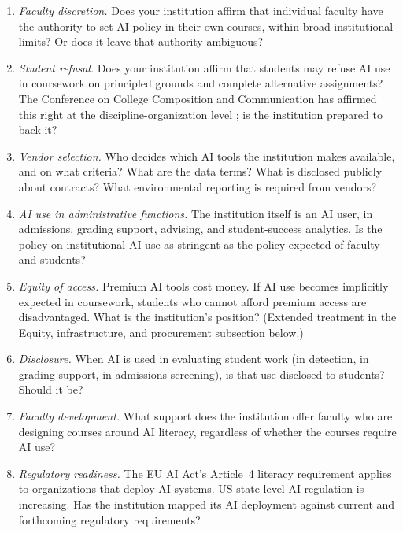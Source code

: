 \documentclass[12pt]{article}
\begin{document}
\begin{enumerate}
\item \emph{Faculty discretion.} Does your institution affirm that individual faculty have the authority to set AI policy in their own courses, within broad institutional limits? Or does it leave that authority ambiguous?

\item \emph{Student refusal.} Does your institution affirm that students may refuse AI use in coursework on principled grounds and complete alternative assignments? The Conference on College Composition and Communication has affirmed this right at the discipline-organization level \autocite{cccc2026resolutions}; is the institution prepared to back it?

\item \emph{Vendor selection.} Who decides which AI tools the institution makes available, and on what criteria? What are the data terms? What is disclosed publicly about contracts? What environmental reporting is required from vendors?

\item \emph{AI use in administrative functions.} The institution itself is an AI user, in admissions, grading support, advising, and student-success analytics. Is the policy on institutional AI use as stringent as the policy expected of faculty and students?

\item \emph{Equity of access.} Premium AI tools cost money. If AI use becomes implicitly expected in coursework, students who cannot afford premium access are disadvantaged. What is the institution's position? (Extended treatment in the Equity, infrastructure, and procurement subsection below.)

\item \emph{Disclosure.} When AI is used in evaluating student work (in detection, in grading support, in admissions screening), is that use disclosed to students? Should it be?

\item \emph{Faculty development.} What support does the institution offer faculty who are designing courses around AI literacy, regardless of whether the courses require AI use?

\item \emph{Regulatory readiness.} The EU AI Act's Article~4 literacy requirement applies to organizations that deploy AI systems. US state-level AI regulation is increasing. Has the institution mapped its AI deployment against current and forthcoming regulatory requirements?
\end{enumerate}
\end{document}
